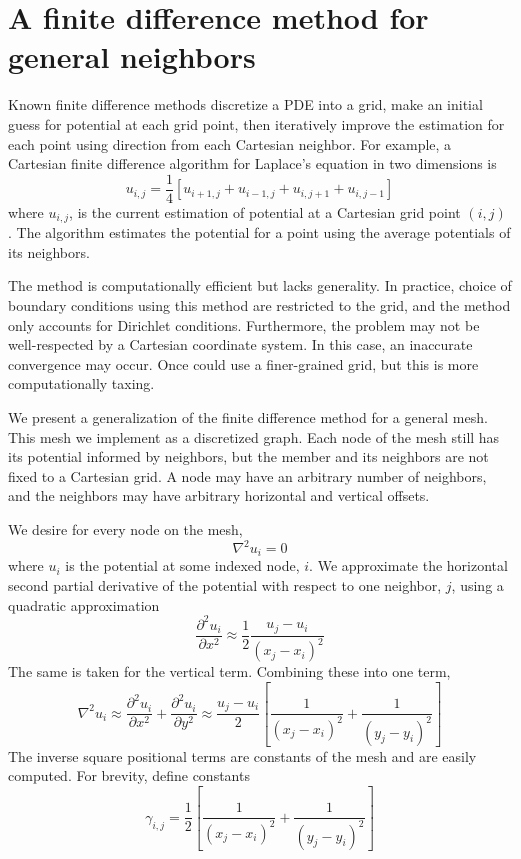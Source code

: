 \section{A finite difference method for general neighbors}
Known finite difference methods discretize a PDE into a grid, make an initial guess for potential at each grid point, then iteratively improve the estimation for each point using direction from each Cartesian neighbor. For example, a Cartesian finite difference algorithm for Laplace's equation in two dimensions is
\begin{equation}
    u_{i,j} = \frac{1}{4}[ 
    u_{i+1,j} +
    u_{i-1,j} +
    u_{i,j+1} +
    u_{i,j-1}]
\end{equation}
where $u_{i,j}$, is the current estimation of potential at a Cartesian grid point $(i,j)$ \cite{Landau2015}. The algorithm estimates the potential for a point using the average potentials of its neighbors.

The method is computationally efficient but lacks generality. In practice, choice of boundary conditions using this method are restricted to the grid, and the method only accounts for Dirichlet conditions. Furthermore, the problem may not be well-respected by a Cartesian coordinate system. In this case, an inaccurate convergence may occur. Once could use a finer-grained grid, but this is more computationally taxing.

We present a generalization of the finite difference method for a general mesh. This mesh we implement as a discretized graph. Each node of the mesh still has its potential informed by neighbors, but the member and its neighbors are not fixed to a Cartesian grid. A node may have an arbitrary number of neighbors, and the neighbors may have arbitrary horizontal and vertical offsets.

We desire for every node on the mesh,
\begin{equation}
    \nabla^2 u_i = 0
\end{equation}
where $u_i$ is the potential at some indexed node, $i$. We approximate the horizontal second partial derivative of the potential with respect to one neighbor, $j$, using a quadratic approximation
\begin{equation}
    \frac{\partial^2 u_i}{\partial x^2} \approx
    \frac{1}{2}\frac{u_j - u_i}{(x_j-x_i)^2}
\end{equation}
The same is taken for the vertical term. Combining these into one term,
\begin{equation}
    \nabla^2 u_i \approx \frac{\partial^2 u_i}{\partial x^2} + \frac{\partial^2 u_i}{\partial y^2} \approx
    \frac{u_j - u_i}{2}[\frac{1}{(x_j - x_i)^2} + \frac{1}{(y_j - y_i)^2}]
\end{equation}
The inverse square positional terms are constants of the mesh and are easily computed. For brevity, define constants
\begin{equation}
    \gamma_{i,j} = \frac{1}{2}[\frac{1}{(x_j - x_i)^2} + \frac{1}{(y_j - y_i)^2}]
\end{equation}

